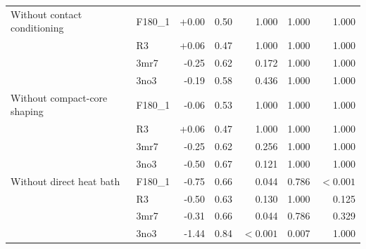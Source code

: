 \begin{tabular}{@{}llrrrrr@{}}
\addlinespace[2pt]
Without contact conditioning & F180\_1 & +0.00 & 0.50 & 1.000 & 1.000 & 1.000 \\
 & R3 & +0.06 & 0.47 & 1.000 & 1.000 & 1.000 \\
 & 3mr7 & -0.25 & 0.62 & 0.172 & 1.000 & 1.000 \\
 & 3no3 & -0.19 & 0.58 & 0.436 & 1.000 & 1.000 \\
\addlinespace[2pt]
Without compact-core shaping & F180\_1 & -0.06 & 0.53 & 1.000 & 1.000 & 1.000 \\
 & R3 & +0.06 & 0.47 & 1.000 & 1.000 & 1.000 \\
 & 3mr7 & -0.25 & 0.62 & 0.256 & 1.000 & 1.000 \\
 & 3no3 & -0.50 & 0.67 & 0.121 & 1.000 & 1.000 \\
\addlinespace[2pt]
Without direct heat bath & F180\_1 & -0.75 & 0.66 & 0.044 & 0.786 & $<\!0.001$ \\
 & R3 & -0.50 & 0.63 & 0.130 & 1.000 & 0.125 \\
 & 3mr7 & -0.31 & 0.66 & 0.044 & 0.786 & 0.329 \\
 & 3no3 & -1.44 & 0.84 & $<\!0.001$ & 0.007 & 1.000 \\
\bottomrule
\end{tabular}
